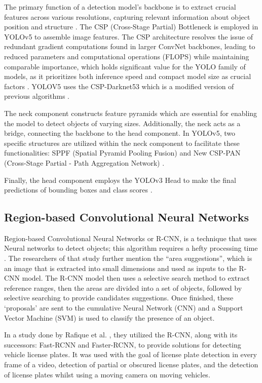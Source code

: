 The primary function of a detection model's backbone is to extract crucial features across various resolutions, capturing relevant information about object position and structure \cite{Kateb_2021}. The CSP (Cross-Stage Partial) Bottleneck is employed in YOLOv5 to assemble image features. The CSP architecture resolves the issue of redundant gradient computations found in larger ConvNet backbones, leading to reduced parameters and computational operations (FLOPS) while maintaining comparable importance, which holds significant value for the YOLO family of models, as it prioritizes both inference speed and compact model size as crucial factors \cite{Solawetz_2020}. YOLOV5 uses the CSP-Darknet53 which is a modified version of previous algorithms \cite{Jocher_Waxmann_2023}.

The neck component constructs feature pyramids which are essential for enabling the model to detect objects of varying sizes. Additionally, the neck acts as a bridge, connecting the backbone to the head component. In YOLOv5, two specific structures are utilized within the neck component to facilitate these functionalities: SPPF (Spatial Pyramid Pooling Fusion) and New CSP-PAN (Cross-Stage Partial - Path Aggregation Network)  \cite{Jocher_Waxmann_2023}.

Finally, the head component employs the YOLOv3 Head to make the final predictions of bounding boxes and class scores  \cite{Jocher_Waxmann_2023}.

\subsection{Region-based Convolutional Neural Networks}

Region-based Convolutional Neural Networks or R-CNN, is a technique that uses Neural networks to detect objects; this algorithm requires a hefty processing time \cite{Cuong_Trinh_Meesad_Nguyen_2022}. The researchers of that study further mention the “area suggestions”, which is an image that is extracted into small dimensions and used as inputs to the R-CNN model. The R-CNN model then uses a selective search method to extract reference ranges, then the areas are divided into a set of objects, followed by selective searching to provide candidates suggestions. Once finished, these ‘proposals’ are sent to the cumulative Neural Network (CNN)  and a Support Vector Machine (SVM) is used to classify the presence of an object.

In a study done by Rafique et al. \citeyear{Rafique_Pedrycz_Jeon_2017}, they utilized the R-CNN, along with its successors: Fast-RCNN and Faster-RCNN, to provide solutions for detecting vehicle license plates. It was used with the goal of license plate detection in every frame of a video, detection of partial or obscured license plates, and the detection of license plates whilst using a moving camera on moving vehicles.




